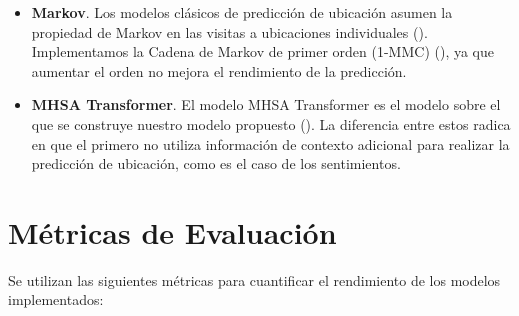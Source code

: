 \begin{itemize}
    \item \textbf{Markov}. Los modelos cl\'asicos de predicci\'on de 
    ubicaci\'on asumen la propiedad de Markov en las visitas a ubicaciones 
    individuales (\cite{ashbrook2002learning}). Implementamos la Cadena de Markov de 
    primer orden (1-MMC) (\cite{gambs2012next}), ya que aumentar el orden no 
    mejora el rendimiento de la predicci\'on.
    \item \textbf{MHSA Transformer}. El modelo MHSA Transformer es el 
    modelo sobre el que se construye nuestro modelo propuesto (\cite{Hong_2023}). 
    La diferencia entre estos 
    radica en que el primero no utiliza informaci\'on de contexto adicional
    para realizar la predicci\'on de 
    ubicaci\'on, como es el caso de los sentimientos.
\end{itemize}

\section{M\'etricas de Evaluaci\'on}

Se utilizan las siguientes m\'etricas para cuantificar el rendimiento de 
los modelos implementados:

